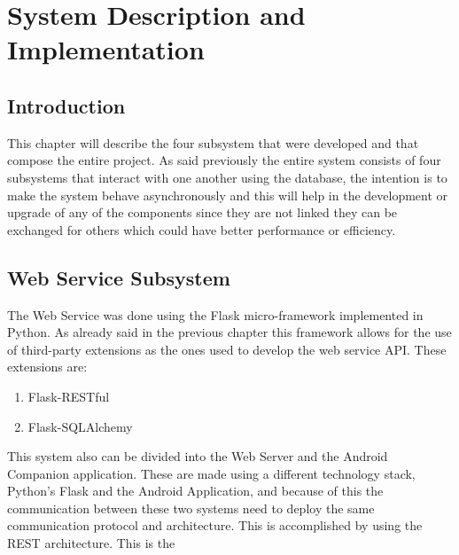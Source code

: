 \chapter{System Description and Implementation}
\label{chap:sys-desc}

\section{Introduction}
\label{chap4:sec:intro}
This chapter will describe the four subsystem that were developed and that
compose the entire project. As said previously the entire system consists of
four subsystems that interact with one another using the database, the intention
is to make the system behave asynchronously and this will help in the
development or upgrade of any of the components since they are not linked they
can be exchanged for others which could have better performance or efficiency.

\section{Web Service Subsystem}
\label{chap4:sec:web-sys}
The Web Service was done using the Flask micro-framework implemented in Python.
As already said in the previous chapter this framework allows for the use of
third-party extensions as the ones used to develop the web service API. These
extensions are:
\begin{enumerate}
	\item Flask-RESTful
	\item Flask-SQLAlchemy
\end{enumerate}

This system also can be divided into the Web Server and the Android Companion
application. These are made using a different technology stack, Python's Flask
and the Android Application, and because of this the communication between these
two systems need to deploy the same communication protocol and architecture.
This is accomplished by using the REST architecture. This is the



